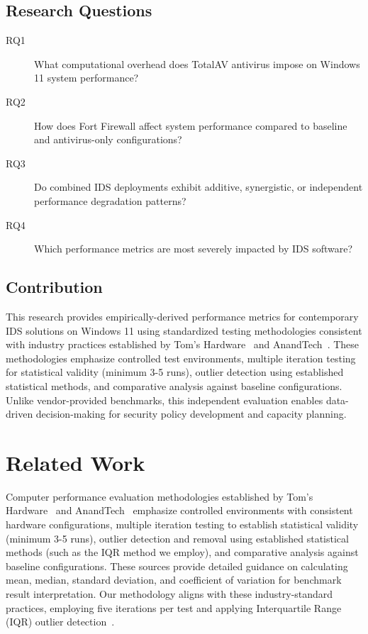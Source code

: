 \documentclass[runningheads,a4paper,english]{llncs}[2022/01/12]
\begin{document}
\subsection{Research Questions}

\begin{description}
\item[RQ1] What computational overhead does TotalAV antivirus impose on Windows 11 system performance?
\item[RQ2] How does Fort Firewall affect system performance compared to baseline and antivirus-only configurations?
\item[RQ3] Do combined IDS deployments exhibit additive, synergistic, or independent performance degradation patterns?
\item[RQ4] Which performance metrics are most severely impacted by IDS software?
\end{description}

\subsection{Contribution}

This research provides empirically-derived performance metrics for contemporary IDS solutions on Windows 11 using standardized testing methodologies consistent with industry practices established by Tom's Hardware~\cite{tomshardware-methodology,tomshardware-testing-guide} and AnandTech~\cite{anandtech-benchmarks,anandtech-statistical-methods}. These methodologies emphasize controlled test environments, multiple iteration testing for statistical validity (minimum 3-5 runs), outlier detection using established statistical methods, and comparative analysis against baseline configurations. Unlike vendor-provided benchmarks, this independent evaluation enables data-driven decision-making for security policy development and capacity planning.

\section{Related Work}
\label{sec:related}

Computer performance evaluation methodologies established by Tom's Hardware~\cite{tomshardware-methodology,tomshardware-testing-guide} and AnandTech~\cite{anandtech-benchmarks,anandtech-statistical-methods} emphasize controlled environments with consistent hardware configurations, multiple iteration testing to establish statistical validity (minimum 3-5 runs), outlier detection and removal using established statistical methods (such as the IQR method we employ), and comparative analysis against baseline configurations. These sources provide detailed guidance on calculating mean, median, standard deviation, and coefficient of variation for benchmark result interpretation. Our methodology aligns with these industry-standard practices, employing five iterations per test and applying Interquartile Range (IQR) outlier detection~\cite{tukey1977}.
\end{document}
